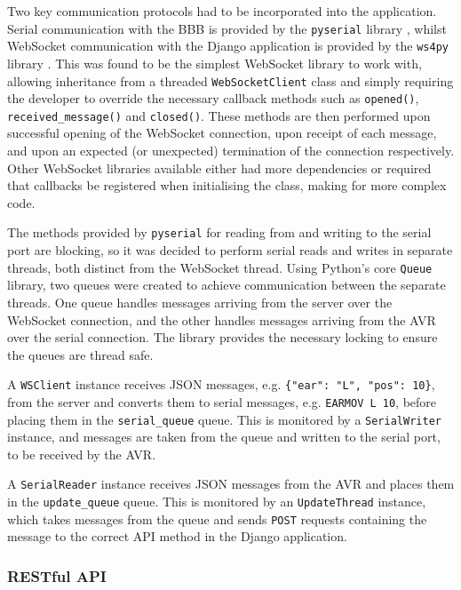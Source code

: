 \documentclass[12pt, a4paper]{article}
\begin{document}
	Two key communication protocols had to be incorporated into the application. Serial communication with the \ac{BBB} is provided by the \verb+pyserial+ library \parencite{pyserial}, whilst WebSocket communication with the Django application is provided by the \verb+ws4py+ library \parencite{ws4py}. This was found to be the simplest WebSocket library to work with, allowing inheritance from a threaded \verb+WebSocketClient+ class and simply requiring the developer to override the necessary callback methods such as \verb+opened()+, \verb+received_message()+ and \verb+closed()+. These methods are then performed upon successful opening of the WebSocket connection, upon receipt of each message, and upon an expected (or unexpected) termination of the connection respectively. Other WebSocket libraries available either had more dependencies or required that callbacks be registered when initialising the class, making for more complex code.

The methods provided by \verb+pyserial+ for reading from and writing to the serial port are blocking, so it was decided to perform serial reads and writes in separate threads, both distinct from the WebSocket thread. Using Python's core \verb+Queue+ library, two queues were created to achieve communication between the separate threads. One queue handles messages arriving from the server over the WebSocket connection, and the other handles messages arriving from the AVR over the serial connection. The library provides the necessary locking to ensure the queues are thread safe.

A \verb+WSClient+ instance receives \ac{JSON} messages, e.g. \verb+{"ear": "L", "pos": 10}+, from the server and converts them to serial messages, e.g. \verb+EARMOV L 10+, before placing them in the \verb+serial_queue+ queue. This is monitored by a \verb+SerialWriter+ instance, and messages are taken from the queue and written to the serial port, to be received by the AVR.

 A \verb+SerialReader+ instance receives \ac{JSON} messages from the AVR and places them in the \verb+update_queue+ queue. This is monitored by an \verb+UpdateThread+ instance, which takes messages from the queue and sends \verb+POST+ requests containing the message to the correct \ac{API} method in the Django application.
 
	\subsubsection{\acs{REST}ful \acs{API}}
	
\end{document}
